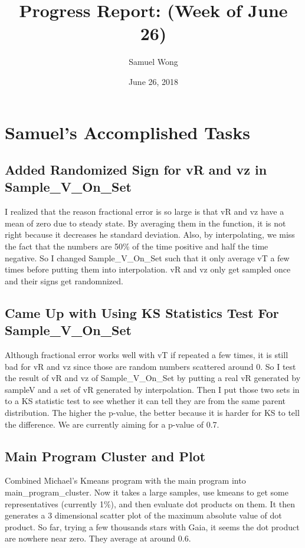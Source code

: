 \documentclass[12pt]{article}
\begin{document}
\title{Progress Report: (Week of June 26)}
\author{Samuel Wong}
\date{June 26, 2018}
\maketitle


\section{Samuel's Accomplished Tasks}
\subsection{Added Randomized Sign for vR and vz in Sample\_V\_On\_Set}
I realized that the reason fractional error is so large is that vR and vz have a mean of zero due to steady state. By averaging them in the function, it is not right because it decreases he standard deviation. Also, by interpolating, we miss the fact that the numbers are 50\% of the time positive and half the time negative. So I changed Sample\_V\_On\_Set such that it only average vT a few times before putting them into interpolation. vR and vz only get sampled once and their signs get randomnized.
\subsection{Came Up with Using KS Statistics Test For Sample\_V\_On\_Set}
Although fractional error works well with vT if repeated a few times, it is still bad for vR and vz since those are random numbers scattered around 0. So I test the result of vR and vz of Sample\_V\_On\_Set by putting a real vR generated by sampleV and a set of vR generated by interpolation. Then I put those two sets in to a KS statistic test to see whether it can tell they are from the same parent distribution. The higher the p-value, the better because it is harder for KS to tell the difference. We are currently aiming for a p-value of 0.7.
\subsection{Main Program Cluster and Plot}
Combined Michael's Kmeans program with the main program into main\_program\_cluster. Now it takes a large samples, use kmeans to get some representatives (currently 1\%), and then evaluate dot products on them. It then generates a 3 dimensional scatter plot of the maximum absolute value of dot product. So far, trying a few thousands stars with Gaia, it seems the dot product are nowhere near zero. They average at around 0.6.
\end{document}
